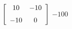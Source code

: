 {$\left[ \begin {array}{cc} 10&-10\\\noalign{\medskip}-10&0\end {array}
 \right]$} 
{$-100$}



  

